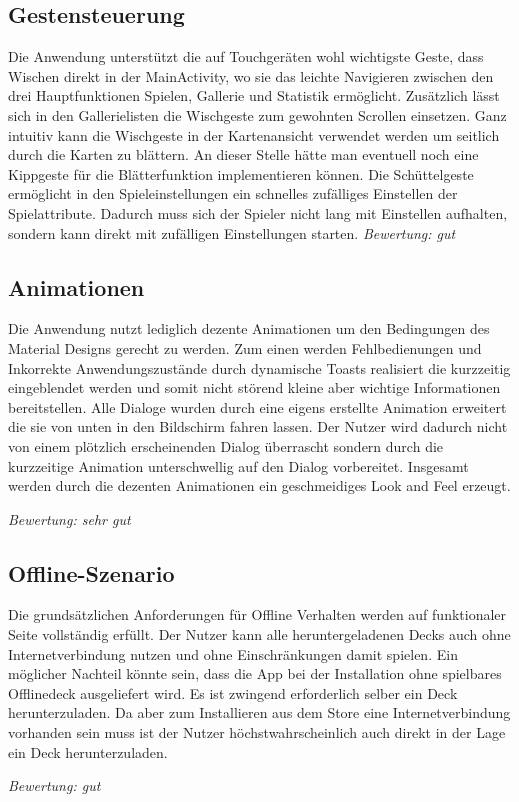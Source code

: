 \subsection{Gestensteuerung}
Die Anwendung unterstützt die auf Touchgeräten wohl wichtigste Geste, dass Wischen direkt in der MainActivity, wo sie das leichte Navigieren zwischen den drei Hauptfunktionen Spielen, Gallerie und Statistik ermöglicht. Zusätzlich lässt sich in den Gallerielisten die Wischgeste zum gewohnten Scrollen einsetzen. Ganz intuitiv kann die Wischgeste in der Kartenansicht verwendet werden um seitlich durch die Karten zu blättern. 
An dieser Stelle hätte man eventuell noch eine Kippgeste für die Blätterfunktion implementieren können.
Die Schüttelgeste ermöglicht in den Spieleinstellungen ein schnelles zufälliges Einstellen der Spielattribute. Dadurch muss sich der Spieler nicht lang mit Einstellen aufhalten, sondern kann direkt mit zufälligen Einstellungen starten.
\vspace{5mm}
\emph{Bewertung: gut}
\vspace{5mm}

\subsection{Animationen}
Die Anwendung nutzt lediglich dezente Animationen um den Bedingungen des Material Designs gerecht zu werden. Zum einen werden Fehlbedienungen und Inkorrekte Anwendungszustände durch dynamische Toasts realisiert die kurzzeitig eingeblendet werden und somit nicht störend kleine aber wichtige Informationen bereitstellen. 
Alle Dialoge wurden durch eine eigens erstellte Animation erweitert die sie von unten in den Bildschirm fahren lassen. Der Nutzer wird dadurch nicht von einem plötzlich erscheinenden Dialog überrascht sondern durch die kurzzeitige Animation unterschwellig auf den Dialog vorbereitet. Insgesamt werden durch die dezenten Animationen ein geschmeidiges Look and Feel erzeugt.

\vspace{5mm}
\emph{Bewertung: sehr gut}
\vspace{5mm}

\subsection{Offline-Szenario}
Die grundsätzlichen Anforderungen für Offline Verhalten werden auf funktionaler Seite vollständig erfüllt. Der Nutzer kann alle heruntergeladenen Decks auch ohne Internetverbindung nutzen und ohne Einschränkungen damit spielen. Ein möglicher Nachteil könnte sein, dass die App bei der Installation ohne spielbares Offlinedeck ausgeliefert wird. Es ist zwingend erforderlich selber ein Deck herunterzuladen. Da aber zum Installieren aus dem Store eine Internetverbindung vorhanden sein muss ist der Nutzer höchstwahrscheinlich auch direkt in der Lage ein Deck herunterzuladen. 

\vspace{5mm}
\emph{Bewertung: gut}
\vspace{5mm}


